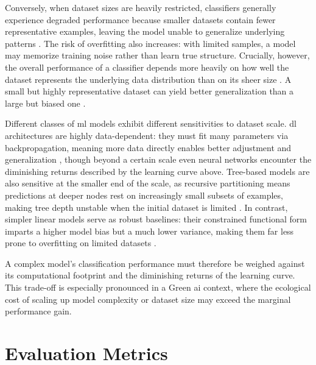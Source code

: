 Conversely, when dataset sizes are heavily restricted, classifiers generally experience degraded performance because smaller datasets contain fewer representative examples, leaving the model unable to generalize underlying patterns \parencite{althnianImpactDatasetSize2021}. The risk of overfitting also increases: with limited samples, a model may memorize training noise rather than learn true structure. Crucially, however, the overall performance of a classifier depends more heavily on how well the dataset represents the underlying data distribution than on its sheer size \parencite{althnianImpactDatasetSize2021}. A small but highly representative dataset can yield better generalization than a large but biased one \parencite{althnianImpactDatasetSize2021}.

Different classes of \gls{ml} models exhibit different sensitivities to dataset scale. \gls{dl} architectures are highly data-dependent: they must fit many parameters via backpropagation, meaning more data directly enables better adjustment and generalization \parencite{althnianImpactDatasetSize2021}, though beyond a certain scale even neural networks encounter the diminishing returns described by the learning curve above. Tree-based models are also sensitive at the smaller end of the scale, as recursive partitioning means predictions at deeper nodes rest on increasingly small subsets of examples, making tree depth unstable when the initial dataset is limited \parencite{althnianImpactDatasetSize2021, breimanRandomForests2001}. In contrast, simpler linear models serve as robust baselines: their constrained functional form imparts a higher model bias but a much lower variance, making them far less prone to overfitting on limited datasets \parencite{hastieElementsStatisticalLearning2017}.

A complex model's classification performance must therefore be weighed against its computational footprint and the diminishing returns of the learning curve. This trade-off is especially pronounced in a Green \gls{ai} context, where the ecological cost of scaling up model complexity or dataset size may exceed the marginal performance gain.

\section{Evaluation Metrics}
\label{sec:theoretical_metrics}

